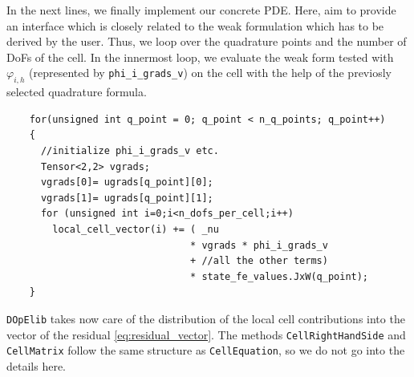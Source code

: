 \documentclass[prodmode,acmtoms]{acmsmall}
\numberwithin{equation}{section}
\renewcommand{\phi}{\varphi}
\newcommand{\dope}{\texttt{DOpElib}}
\begin{document}
In the next lines, we finally implement our concrete PDE. Here, aim to provide 
an interface which is closely related to the weak formulation which 
has to be derived by the user. Thus,
we loop over the quadrature points and the number of DoFs of the cell. In the innermost loop, we evaluate the weak form tested with $\phi_{i,h}$ (represented by \texttt{phi\_i\_grads\_v}) on the cell with the help of the previosly selected quadrature formula. 
 \begin{lstlisting}
    for(unsigned int q_point = 0; q_point < n_q_points; q_point++)
    {
      //initialize phi_i_grads_v etc.
      Tensor<2,2> vgrads;
      vgrads[0]= ugrads[q_point][0]; 
      vgrads[1]= ugrads[q_point][1];
      for (unsigned int i=0;i<n_dofs_per_cell;i++)
        local_cell_vector(i) += ( _nu 
                                * vgrads * phi_i_grads_v 
                                + //all the other terms)
                                * state_fe_values.JxW(q_point);
    }
\end{lstlisting}
\dope{} takes now care of the distribution of the local cell contributions into  the vector of the residual \eqref{eq:residual_vector}. The methods \texttt{CellRightHandSide} and \texttt{CellMatrix} follow the same structure as 
\texttt{CellEquation}, so we do not go into the details here.
% 
% 
\end{document}
